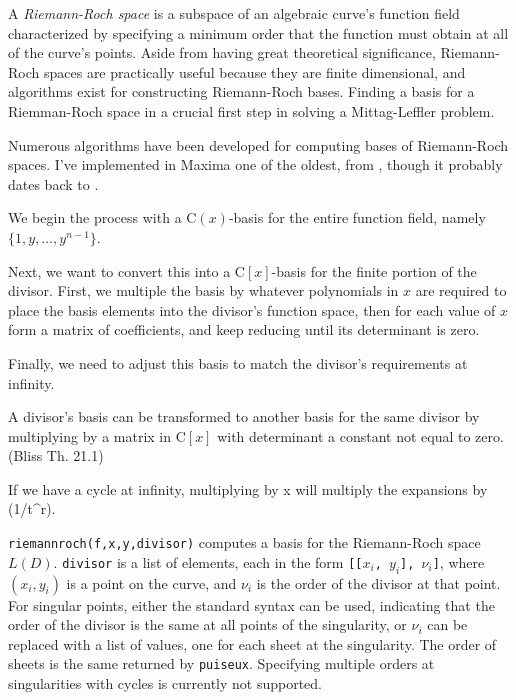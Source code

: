 A {\it Riemann-Roch space} is a subspace of an algebraic curve's
function field characterized by specifying a minimum order that the
function must obtain at all of the curve's points.  Aside from having
great theoretical significance, Riemann-Roch spaces are practically
useful because they are finite dimensional, and algorithms exist for
constructing Riemann-Roch bases.  Finding a basis for a Riemman-Roch
space in a crucial first step in solving a Mittag-Leffler problem.

Numerous algorithms have been developed for computing bases of
Riemann-Roch spaces.  I've implemented in Maxima one of the oldest,
from \cite{bliss}, though it probably dates back
to \cite{dedekind-weber}.

We begin the process with a ${\mathrm C}(x)$-basis for the entire
function field, namely $\{1, y, \ldots, y^{n-1}\}$.

Next, we want to convert this into a ${\mathrm C}[x]$-basis for the
finite portion of the divisor.  First, we multiple the basis by
whatever polynomials in $x$ are required to place the basis elements
into the divisor's function space, then for each value of $x$ form
a matrix of coefficients, and keep reducing until its determinant is zero.

Finally, we need to adjust this basis to match the divisor's requirements at infinity.

A divisor's basis can be transformed to another basis for the same
divisor by multiplying by a matrix in ${\mathrm C}[x]$ with
determinant a constant not equal to zero. (Bliss Th. 21.1)

If we have a cycle at infinity, multiplying by x will multiply
the expansions by (1/t^r).

{\tt riemannroch(f,x,y,divisor)} computes a basis for the Riemann-Roch
space $L(D)$.  {\tt divisor} is a list of elements, each in the form
{\tt [[$x_i$, $y_i$], $\nu_i$]}, where $(x_i, y_i)$ is a point on the
curve, and $\nu_i$ is the order of the divisor at that point.  For
singular points, either the standard syntax can be used, indicating
that the order of the divisor is the same at all points of the
singularity, or $\nu_i$ can be replaced with a list of values, one for
each sheet at the singularity.  The order of sheets is the same
returned by {\tt puiseux}.  Specifying multiple orders at
singularities with cycles is currently not supported.

